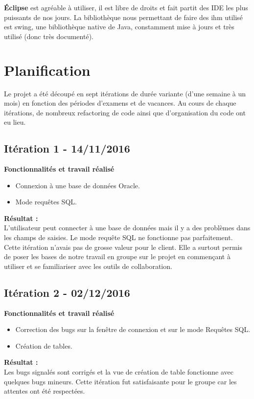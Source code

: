 \textbf{Éclipse} est agréable à utiliser, il est libre de droits et fait partit des IDE les plus puissants de nos jours.
La bibliothèque nous permettant de faire des \gls{ihm} utilisé est swing, une bibliothèque native de Java, constamment mise à jours et très utilisé (donc très documenté).

\section{Planification}
Le projet a été découpé en sept itérations de durée variante (d'une semaine à un mois) en fonction des périodes d'examens et de vacances. Au cours de chaque itérations, de nombreux refactoring de code ainsi que d'organisation du code ont eu lieu.


\subsection{Itération 1 - 14/11/2016}

\textbf{Fonctionnalités et travail réalisé}
\begin{itemize}
\item Connexion à une base de données Oracle.
\item Mode requêtes SQL.\\
\end{itemize}

\textbf{Résultat :}\\
L'utilisateur peut connecter à une base de données mais il y a des problèmes dans les champs de saisies. Le mode requête SQL ne fonctionne pas parfaitement.
Cette itération n'avais pas de grosse valeur pour le client. Elle a surtout permis de poser les bases de notre travail en groupe sur le projet en commençant à utiliser et se familiariser avec les outils de collaboration.


\subsection{Itération 2 - 02/12/2016}
\textbf{Fonctionnalités et travail réalisé}
\begin{itemize}
\item Correction des bugs sur la fenêtre de connexion et sur le mode Requêtes SQL.
\item Création de tables.\\
\end{itemize}

\textbf{Résultat :}\\
Les bugs signalés sont corrigés et la vue de création de table fonctionne avec quelques bugs mineurs.
Cette itération fut satisfaisante pour le groupe car les attentes ont été respectées.


